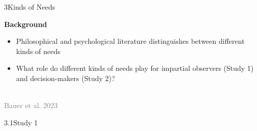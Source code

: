 \documentclass[xcolor=table,9pt,aspectratio=169]{beamer}
\begin{document}
\begin{frame}{\vspace*{10mm}3\hspace*{1em}Kinds of Needs}
\begin{multicols}{2}
   \textbf{Background}\\
   \medskip
   \begin{itemize}
      \item Philosophical and psychological literature distinguishes between different kinds of needs
      \item What role do different kinds of needs play for impartial observers (Study 1) and decision-makers (Study 2)?
   \end{itemize}
   \vfill
   \begin{center}
      \\
      \textcolor{gray}{Bauer et al. 2023}
   \end{center}
\end{multicols}
\end{frame}


\begin{frame}
\begin{overlayarea}{\textwidth}{0.81\paperheight}{
   \vspace*{11mm}
   \textcolor{uolblue}
   {3.1\hspace*{1em}Study 1}
}
\end{overlayarea}
\end{frame}
\end{document}
